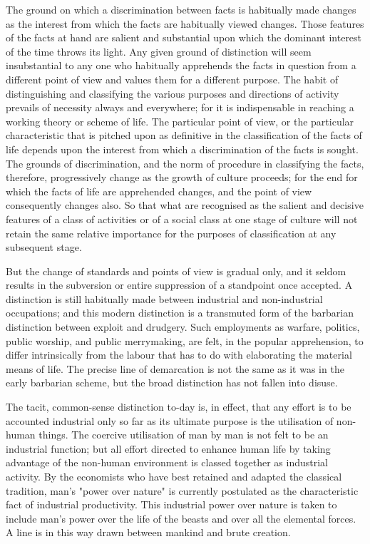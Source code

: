\documentclass[12pt]{report}
\begin{document}
The ground on which a discrimination between facts is habitually made
changes as the interest from which the facts are habitually viewed
changes. Those features of the facts at hand are salient and substantial
upon which the dominant interest of the time throws its light. Any given
ground of distinction will seem insubstantial to any one who habitually
apprehends the facts in question from a different point of view and
values them for a different purpose. The habit of distinguishing and
classifying the various purposes and directions of activity prevails of
necessity always and everywhere; for it is indispensable in reaching a
working theory or scheme of life. The particular point of view, or the
particular characteristic that is pitched upon as definitive in the
classification of the facts of life depends upon the interest from which
a discrimination of the facts is sought. The grounds of discrimination,
and the norm of procedure in classifying the facts, therefore,
progressively change as the growth of culture proceeds; for the end for
which the facts of life are apprehended changes, and the point of view
consequently changes also. So that what are recognised as the salient
and decisive features of a class of activities or of a social class at
one stage of culture will not retain the same relative importance for
the purposes of classification at any subsequent stage.

But the change of standards and points of view is gradual only, and it
seldom results in the subversion or entire suppression of a standpoint
once accepted. A distinction is still habitually made between industrial
and non-industrial occupations; and this modern distinction is a
transmuted form of the barbarian distinction between exploit and
drudgery. Such employments as warfare, politics, public worship, and
public merrymaking, are felt, in the popular apprehension, to differ
intrinsically from the labour that has to do with elaborating the
material means of life. The precise line of demarcation is not the same
as it was in the early barbarian scheme, but the broad distinction has
not fallen into disuse.

The tacit, common-sense distinction to-day is, in effect, that any
effort is to be accounted industrial only so far as its ultimate purpose
is the utilisation of non-human things. The coercive utilisation of man
by man is not felt to be an industrial function; but all effort directed
to enhance human life by taking advantage of the non-human environment
is classed together as industrial activity. By the economists who have
best retained and adapted the classical tradition, man's "power over
nature" is currently postulated as the characteristic fact of industrial
productivity. This industrial power over nature is taken to include
man's power over the life of the beasts and over all the elemental
forces. A line is in this way drawn between mankind and brute creation.
\end{document}
